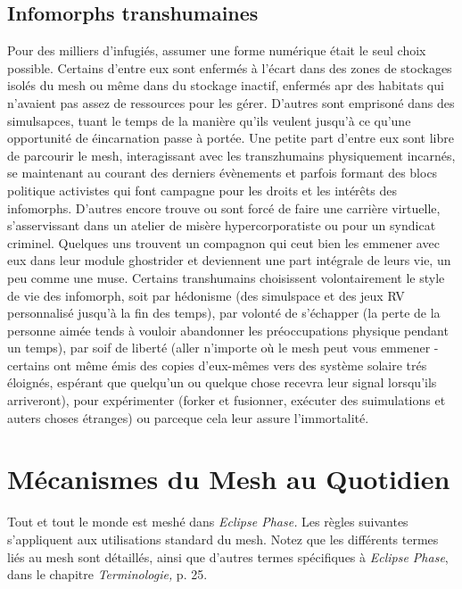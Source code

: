 \subsection{Infomorphs transhumaines} 

Pour des milliers d'infugiés, assumer une forme numérique était le seul choix possible. Certains d'entre eux sont enfermés à l'écart dans des zones de stockages isolés du mesh ou même dans du stockage inactif, enfermés apr des habitats qui n'avaient pas assez de ressources pour les gérer. D'autres sont emprisoné dans des simulsapces, tuant le temps de la manière qu'ils veulent jusqu'à ce qu'une opportunité de éincarnation passe à portée. Une petite part d'entre eux sont libre de parcourir le mesh, interagissant avec les transzhumains physiquement incarnés, se maintenant au courant des derniers évènements et parfois formant des blocs politique activistes qui font campagne pour les droits et les intérêts des infomorphs. D'autres encore trouve ou sont forcé de faire une carrière virtuelle, s'asservissant dans un atelier de misère hypercorporatiste ou pour un syndicat criminel. Quelques uns trouvent un compagnon qui ceut bien les emmener avec eux dans leur module ghostrider et deviennent une part intégrale de leurs vie, un peu comme une muse. Certains transhumains choisissent volontairement le style de vie des infomorph, soit par hédonisme (des simulspace et des jeux RV personnalisé jusqu'à la fin des temps), par volonté de s'échapper (la perte de la personne aimée tends à vouloir abandonner les préoccupations physique pendant un temps), par soif de liberté (aller n'importe où le mesh peut vous emmener - certains ont même émis des copies d'eux-mêmes vers des système solaire trés éloignés, espérant que quelqu'un ou quelque chose recevra leur signal lorsqu'ils arriveront), pour expérimenter (forker et fusionner, exécuter des suimulations et auters choses étranges) ou parceque cela leur assure l'immortalité. 

\section{Mécanismes du Mesh au Quotidien} 

Tout et tout le monde est meshé dans \textit{Eclipse Phase. } Les règles suivantes s'appliquent aux utilisations standard du mesh. Notez que les différents termes liés au mesh sont détaillés, ainsi que d'autres termes spécifiques à \textit{Eclipse Phase}, dans le chapitre \textit{Terminologie,} p. 25. 

